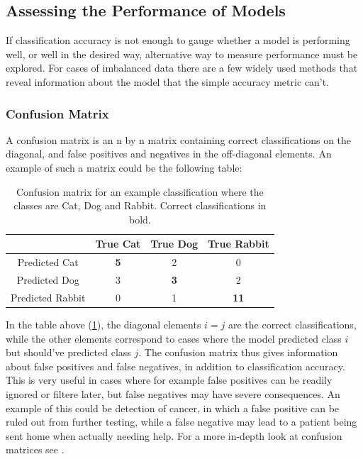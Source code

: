 \subsection{Assessing the Performance of Models}
If classification accuracy is not enough to gauge whether a model is
performing well, or well in the desired way, alternative way to measure
performance must be explored. For cases of imbalanced data there are a few
widely used methods that reveal information about the model that the simple
accuracy metric can't.

\subsubsection{Confusion Matrix}
A confusion matrix is an n by n matrix containing correct classifications
on the diagonal, and false positives and negatives in the off-diagonal elements.
An example of such a matrix could be the following table:
\begin{table}[h]
    \centering
    \begin{tabular}{c|c|c|c}
     & True Cat & True Dog & True Rabbit \\
    \hline
    Predicted Cat & \textbf{5} & 2 & 0 \\
    \hline
    Predicted Dog & 3 & \textbf{3} & 2 \\
    \hline
    Predicted Rabbit & 0 & 1 & \textbf{11} \\
\end{tabular}
\caption{Confusion matrix for an example classification where the classes
         are Cat, Dog and Rabbit. Correct classifications in bold.}
\label{tab:confmat-example}
\end{table}
In the table above (\ref{tab:confmat-example}), the diagonal elements
$i = j$ are the correct classifications, while the other elements correspond
to cases where the model predicted class $i$ but should've predicted class $j$.
The confusion matrix thus gives information about false positives and false 
negatives, in addition to classification accuracy. This is very useful
in cases where for example false positives can be readily ignored or filtere
later, but false negatives may have severe consequences. An example of this
could be detection of cancer, in which a false positive can be ruled out
from further testing, while a false negative may lead to a patient being sent
home when actually needing help. For a more in-depth look at confusion matrices
see \cite{roc-article}.
